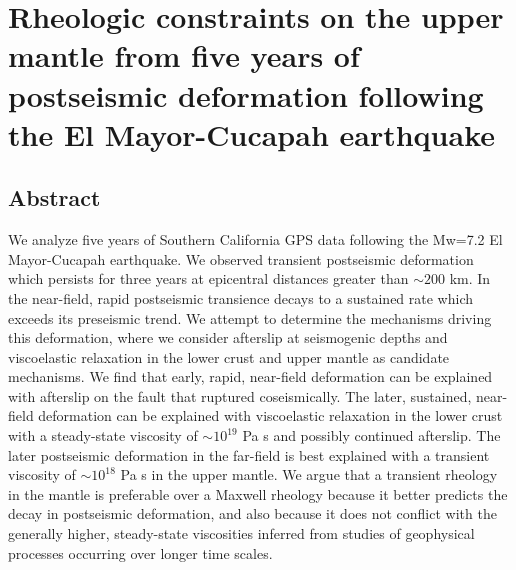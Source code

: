 \chapter{Rheologic constraints on the upper mantle from five years of postseismic deformation following the El Mayor-Cucapah earthquake}

\section{Abstract}
We analyze five years of Southern California GPS data following the Mw=7.2 El Mayor-Cucapah earthquake.  We observed transient postseismic deformation which persists for three years at epicentral distances greater than ${\sim}200$ km.  In the near-field, rapid postseismic transience decays to a sustained rate which exceeds its preseismic trend.  We attempt to determine the mechanisms driving this deformation, where we consider afterslip at seismogenic depths and viscoelastic relaxation in the lower crust and upper mantle as candidate mechanisms.  We find that early, rapid, near-field deformation can be explained with afterslip on the fault that ruptured coseismically. The later, sustained, near-field deformation can be explained with viscoelastic relaxation in the lower crust with a steady-state viscosity of ${\sim}10^{19}$ Pa s and possibly continued afterslip.  The later postseismic deformation in the far-field is best explained with a transient viscosity of ${\sim}10^{18}$ Pa s in the upper mantle. We argue that a transient rheology in the mantle is preferable over a Maxwell rheology because it better predicts the decay in postseismic deformation, and also because it does not conflict with the generally higher, steady-state viscosities inferred from studies of geophysical processes occurring over longer time scales.

